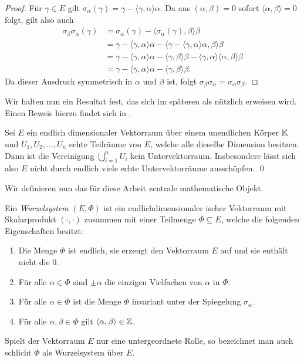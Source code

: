 \begin{proof}
  Für $\gamma \in E$ gilt $\sigma_\alpha(\gamma) = \gamma - \langle \gamma, \alpha \rangle \alpha$. Da aus $(\alpha, \beta) = 0$ sofort $\langle \alpha, \beta \rangle = 0$ folgt, gilt also auch
  \begin{align*}
    \sigma_\beta \sigma_\alpha(\gamma) 
    &= \sigma_\alpha(\gamma) - \langle \sigma_\alpha(\gamma), \beta \rangle \beta \\
    &= \gamma - \langle \gamma, \alpha \rangle \alpha 
              - \langle \gamma- \langle \gamma, \alpha\rangle \alpha, \beta \rangle \beta \\
    &= \gamma - \langle \gamma, \alpha \rangle \alpha 
              - \langle \gamma, \beta \rangle \beta - \langle \gamma, \alpha \rangle \langle \alpha, \beta \rangle \beta \\
    &= \gamma - \langle \gamma, \alpha \rangle \alpha - \langle \gamma, \beta \rangle \beta.
  \end{align*} 
  Da dieser Ausdruck symmetrisch in $\alpha$ und $\beta$ ist, folgt $\sigma_\beta \sigma_\alpha = \sigma_\alpha \sigma_\beta$.
\end{proof}

Wir halten nun ein Resultat fest, das sich im späteren als nützlich erweisen wird. Einen Beweis hierzu findet sich in \cite[S.123 und S.242]{erdmann2006introduction}.

\begin{prop}
  \label{prop:unterraumAusschoepfung} 
  Sei $E$ ein endlich dimensionaler Vektorraum über einem unendlichen Körper $\mathbb{K}$ und $U_1, U_2, \dots, U_n$ echte Teilräume von $E$, welche alle dieselbe Dimension besitzen.
  Dann ist die Vereinigung $\bigcup_{i=1}^n U_i$ kein Untervektorraum.
  Insbesondere lässt sich also $E$ nicht durch endlich viele echte Untervektorräume ausschöpfen.
  \qed
\end{prop}

Wir definieren nun das für diese Arbeit zentrale mathematische Objekt.

\begin{defn}
  Ein \emph{Wurzelsystem} $(E,\Phi)$ ist ein endlichdimensionaler \euklid ischer Vektorraum mit Skalarprodukt $(\cdot,\cdot)$ zusammen mit einer Teilmenge $\Phi \subseteq E$, welche die folgenden Eigenschaften besitzt:
  \begin{enumerate}[(R1)]
    \item\label{it:R1} Die Menge $\Phi$ ist endlich, sie erzeugt den Vektorraum $E$ auf und sie enthält nicht die $0$.
    \item\label{it:R2} Für alle $\alpha \in \Phi$ sind $\pm \alpha$ die einzigen Vielfachen von $\alpha$ in $\Phi$.
    \item\label{it:R3} Für alle $\alpha \in \Phi$ ist die Menge $\Phi$ invariant unter der Spiegelung $\sigma_\alpha$.
    \item\label{it:R4} Für alle $\alpha, \beta \in \Phi$ gilt $\langle \alpha, \beta \rangle \in \mathbb{Z}$.
  \end{enumerate}
  Spielt der Vektorraum $E$ nur eine untergeordnete Rolle, so bezeichnet man auch schlicht $\Phi$ als Wurzelsystem über $E$.
\end{defn}

